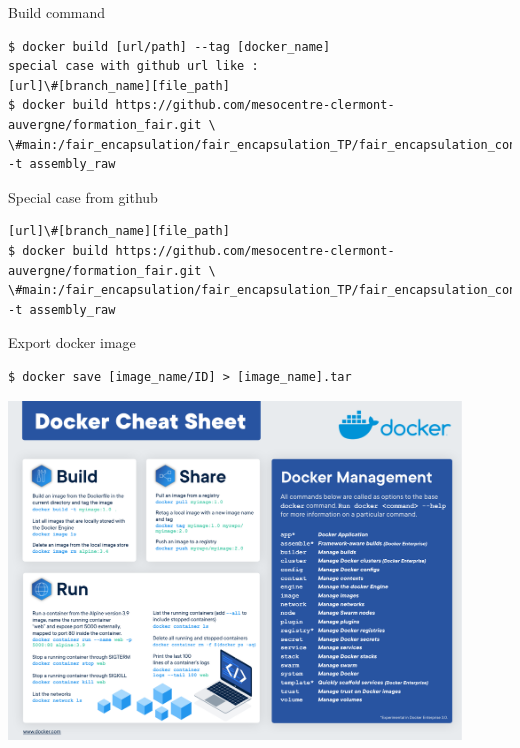 \begin{frame}[fragile]{Build command}
\begin{verbatim}
$ docker build [url/path] --tag [docker_name]
special case with github url like :
[url]\#[branch_name][file_path]
$ docker build https://github.com/mesocentre-clermont-auvergne/formation_fair.git \
\#main:/fair_encapsulation/fair_encapsulation_TP/fair_encapsulation_containers/fair_encapsulation_docker/docker_assembly_raw 
-t assembly_raw
\end{verbatim}
\end{frame}

\begin{frame}[fragile]{Special case from github}
\begin{verbatim}
[url]\#[branch_name][file_path]
$ docker build https://github.com/mesocentre-clermont-auvergne/formation_fair.git \
\#main:/fair_encapsulation/fair_encapsulation_TP/fair_encapsulation_containers/fair_encapsulation_docker/docker_assembly_raw 
-t assembly_raw
\end{verbatim}
\end{frame}


\begin{frame}[fragile]{Export docker image}
\begin{verbatim}
$ docker save [image_name/ID] > [image_name].tar
\end{verbatim}
\end{frame}

\begin{frame}
\centering\includegraphics[width=0.9\textwidth]{docker-cheat-sheet.pdf}
\end{frame}

